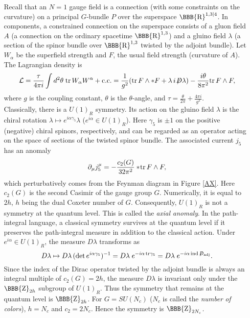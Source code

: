 \documentclass[lecture]{qft-l}
\newcommand{\al}{\alpha}
\newcommand{\gam}{\gamma}
\newcommand{\lam}{\lambda}
\newcommand{\tht}{\theta}
\newcommand{\ZZ}{{\mbox{\BBB{Z}}}}
\newcommand{\RE}{{\mbox{\BBB{R}}}}
\newcommand{\inv}[1]{\frac{1}{#1}}
\newcommand{\e}[1]{e^{{#1}}}
\newcommand{\ii}{i}
\newcommand{\dr}{d}
\newcommand{\pdr}{\partial}
\newcommand{\cc}{{\rm c.c.}}
\newcommand{\tr}{{\rm tr}}
\newcommand{\LL}{{\mathcal L}}
\newcommand{\dirac}{\not\kern-3pt D}
\numberwithin{figure}{chapter}
\begin{document}
Recall that an $N=1$ gauge field is a connection (with some constraints on 
the curvature) on a principal $G$-bundle $P$ over the superspace $\RE^{1,3|4}$.
In components, a constrained connection on the superspace consists of 
a gluon field $A$ (a connection on the ordinary spacetime $\RE^{1,3}$) 
and a gluino field $\lam$ (a section of the spinor bundle over $\RE^{1,3}$
twisted by the adjoint bundle).
Let $W_\al$ be the superfield strength and $F$, the usual field strength
(curvature of $A$).
The Lagrangian density is
\begin{equation}\label{LYM}
\LL=\frac{\tau}{4\pi\ii}\int\dr^2\tht\;\tr\,W_\al W^\al+\cc=\inv{g^2}
(\tr\,F\wedge*F+\lam\,\ii\!\dirac\lam)-\frac{\ii\tht}{8\pi^2}\tr\,F\wedge F,
\end{equation}
where $g$ is the coupling constant, $\tht$ is the $\tht$-angle, and
$\tau=\frac{\tht}{2\pi}+\frac{4\pi\ii}{g^2}$.\\

Classically, there is a $U(1)_R$ symmetry.
Its action on the gluino field $\lam$ is the chiral rotation
$\lam\mapsto\e{\ii\al\gam_5}\lam$ ($\e{\ii\al}\in U(1)_R$).
Here $\gam_5$ is $\pm1$ on the positive (negative) chiral spinors, 
respectively, and can be regarded as an operator acting on the space of 
sections of the twisted spinor bundle.
The associated current $j_5$ has an anomaly
\begin{equation}
\pdr_\mu j_5^\mu=-\frac{c_2(G)}{32\pi^2}*\!\tr\,F\wedge F,
\end{equation}
which perturbatively comes from the Feynman diagram in Figure \ref{AX}.
Here $c_2(G)$ is the second Casimir of the gauge group $G$.
Numerically, it is equal to $2h$, $h$ being the dual Coxeter number of $G$.
Consequently, $U(1)_R$ is not a symmetry at the quantum level.
This is called the {\em axial anomaly}.
In the path-integral language, a classical symmetry survives at the quantum 
level if it preserves the path-integral measure in addition to the classical
action.
Under $\e{\ii\al}\in U(1)_R$, the measure $D\lam$ transforms as
\begin{equation}\label{meas}
D\lam\mapsto D\lam\,(\det\e{\ii\al\gam_5})^{-1}
=D\lam\;\e{-\ii\al\,\tr\gam_5}
=D\lam\;\e{-\ii\al\,\mathrm{ind}\,\not\!\,D_{\mathrm{adj}}}.
\end{equation}
Since the index of the Dirac operator twisted by the adjoint bundle is
always an integral multiple of $c_2(G)=2h$, the measure $D\lam$ is invariant
only under the $\ZZ_{2h}$ subgroup of $U(1)_R$.
Thus the symmetry that remains at the quantum level is $\ZZ_{2h}$.
For $G=SU(N_c)$ ($N_c$ is called the {\em number of colors}),
$h=N_c$ and $c_2=2N_c$.
Hence the symmetry is $\ZZ_{2N_c}$.
\end{document}
